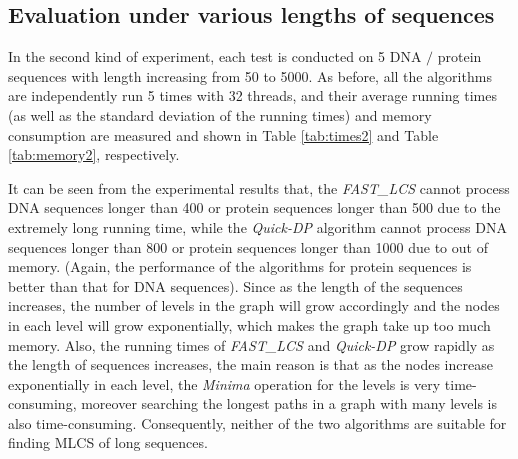 \documentclass[utf8]{frontiersSCNS} %
\begin{document}
\subsection{Evaluation under various lengths of sequences}
\label{sec:times2}

In the second kind of experiment, each test is conducted on 5 DNA $/$ protein
sequences with length increasing from 50 to 5000. As before, all the algorithms
are independently run 5 times with 32 threads, and their average running times
(as well as the standard deviation of the running times) and memory consumption
are measured and shown in Table \ref{tab:times2} and Table \ref{tab:memory2},
respectively.

It can be seen from the experimental results that, the \emph{FAST\_LCS} cannot
process DNA sequences longer than 400 or protein sequences longer than 500 due
to the extremely long running time, while the \emph{Quick-DP} algorithm cannot
process DNA sequences longer than 800 or protein sequences longer than 1000 due
to out of memory. (Again, the performance of the algorithms for protein
sequences is better than that for DNA sequences). Since as the length of the
sequences increases, the number of levels in the graph will grow accordingly and
the nodes in each level will grow exponentially, which makes the graph take up
too much memory. Also, the running times of \emph{FAST\_LCS} and \emph{Quick-DP}
grow rapidly as the length of sequences increases, the main reason is that as
the nodes increase exponentially in each level, the \emph{Minima} operation for
the levels is very time-consuming, moreover searching the longest paths in a
graph with many levels is also time-consuming. Consequently, neither of the two
algorithms are suitable for finding MLCS of long sequences.
\end{document}
